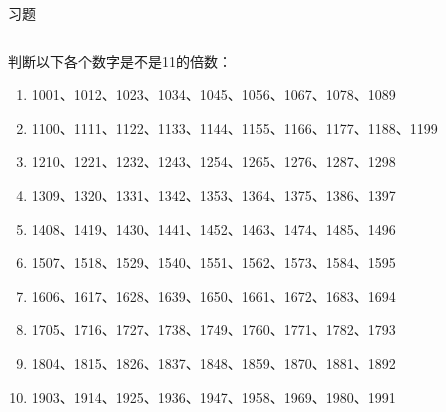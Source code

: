 \documentclass[aspectratio=169]{ctexbeamer} %
\begin{document}
\begin{frame}[t]{习题}
\begin{columns}
\begin{spacing}{1.2}
\normalsize
判断以下各个数字是不是11的倍数：
\begin{enumerate}[label={\arabic*.}]
\item 1001、1012、1023、1034、1045、1056、1067、1078、1089
\item 1100、1111、1122、1133、1144、1155、1166、1177、1188、1199
\item 1210、1221、1232、1243、1254、1265、1276、1287、1298
\item 1309、1320、1331、1342、1353、1364、1375、1386、1397
\item 1408、1419、1430、1441、1452、1463、1474、1485、1496
\item 1507、1518、1529、1540、1551、1562、1573、1584、1595
\item 1606、1617、1628、1639、1650、1661、1672、1683、1694
\item 1705、1716、1727、1738、1749、1760、1771、1782、1793
\item 1804、1815、1826、1837、1848、1859、1870、1881、1892
\item 1903、1914、1925、1936、1947、1958、1969、1980、1991
\end{enumerate}
\end{spacing}
\end{columns}
\end{frame}
\end{document}
